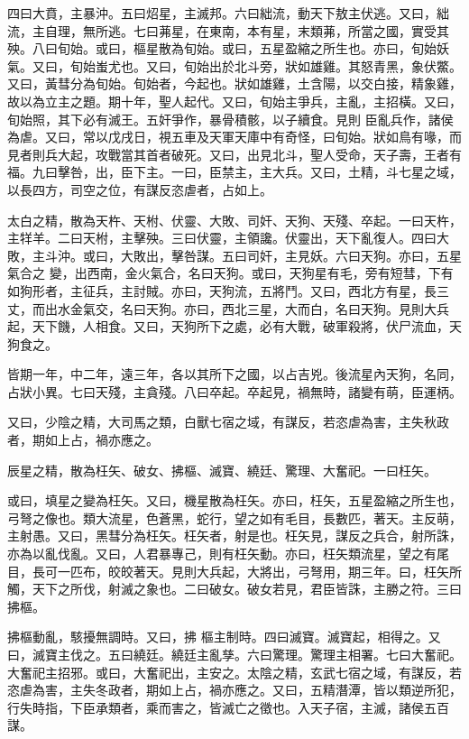 \begin{pinyinscope}
 四曰大賁，主暴沖。五曰炤星，主滅邦。六曰絀流，動天下敖主伏逃。又曰，絀流，主自理，無所逃。七曰茀星，在東南，本有星，末類茀，所當之國，實受其殃。八曰旬始。或曰，樞星散為旬始。或曰，五星盈縮之所生也。亦曰，旬始妖氣。又曰，旬始蚩尤也。又曰，旬始出於北斗旁，狀如雄雞。其怒青黑，象伏鱉。又曰，黃彗分為旬始。旬始者，今起也。狀如雄雞，土含陽，以交白接，精象雞，故以為立主之題。期十年，聖人起代。又曰，旬始主爭兵，主亂，主招橫。又曰，旬始照，其下必有滅王。五奸爭作，暴骨積骸，以子續食。見則
 臣亂兵作，諸侯為虐。又曰，常以戊戌日，視五車及天軍天庫中有奇怪，曰旬始。狀如鳥有喙，而見者則兵大起，攻戰當其首者破死。又曰，出見北斗，聖人受命，天子壽，王者有福。九曰擊咎，出，臣下主。一曰，臣禁主，主大兵。又曰，土精，斗七星之域，以長四方，司空之位，有謀反恣虐者，占如上。



 太白之精，散為天杵、天柎、伏靈、大敗、司奸、天狗、天殘、卒起。一曰天杵，主䍧羊。二曰天柎，主擊殃。三曰伏靈，主領讒。伏靈出，天下亂復人。四曰大敗，主斗沖。或曰，大敗出，擊咎謀。五曰司奸，主見妖。六曰天狗。亦曰，五星氣合之
 變，出西南，金火氣合，名曰天狗。或曰，天狗星有毛，旁有短彗，下有如狗形者，主征兵，主討賊。亦曰，天狗流，五將鬥。又曰，西北方有星，長三丈，而出水金氣交，名曰天狗。亦曰，西北三星，大而白，名曰天狗。見則大兵起，天下饑，人相食。又曰，天狗所下之處，必有大戰，破軍殺將，伏尸流血，天狗食之。



 皆期一年，中二年，遠三年，各以其所下之國，以占吉兇。後流星內天狗，名同，占狀小異。七曰天殘，主貪殘。八曰卒起。卒起見，禍無時，諸變有萌，臣運柄。



 又曰，少陰之精，大司馬之類，白獸七宿之域，有謀反，若恣虐為害，主失秋政者，期如上占，禍亦應之。



 辰星之精，散為枉矢、破女、拂樞、滅寶、繞廷、驚理、大奮祀。一曰枉矢。



 或曰，填星之變為枉矢。又曰，機星散為枉矢。亦曰，枉矢，五星盈縮之所生也，弓弩之像也。類大流星，色蒼黑，蛇行，望之如有毛目，長數匹，著天。主反萌，主射愚。又曰，黑彗分為枉矢。枉矢者，射是也。枉矢見，謀反之兵合，射所誅，亦為以亂伐亂。又曰，人君暴專己，則有枉矢動。亦曰，枉矢類流星，望之有尾目，長可一匹布，皎皎著天。見則大兵起，大將出，弓弩用，期三年。曰，枉矢所觸，天下之所伐，射滅之象也。二曰破女。破女若見，君臣皆誅，主勝之符。三曰拂樞。



 拂樞動亂，駭擾無調時。又曰，拂
 樞主制時。四曰滅寶。滅寶起，相得之。又曰，滅寶主伐之。五曰繞廷。繞廷主亂孳。六曰驚理。驚理主相署。七曰大奮祀。大奮祀主招邪。或曰，大奮祀出，主安之。太陰之精，玄武七宿之域，有謀反，若恣虐為害，主失冬政者，期如上占，禍亦應之。又曰，五精潛潭，皆以類逆所犯，行失時指，下臣承類者，乘而害之，皆滅亡之徵也。入天子宿，主滅，諸侯五百謀。




\end{pinyinscope}
